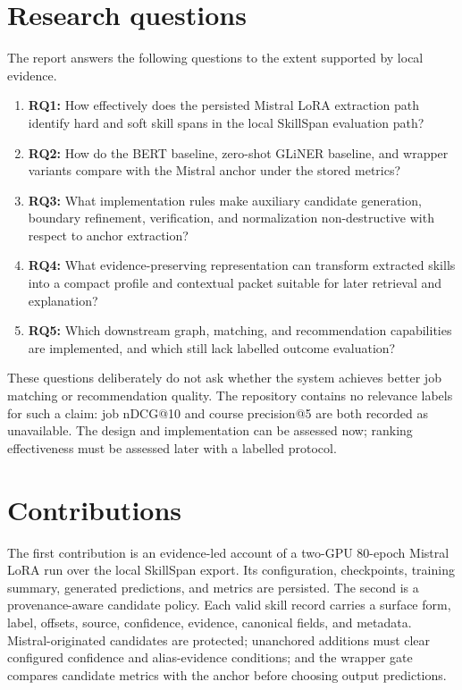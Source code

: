 \section{Research questions}

The report answers the following questions to the extent supported by local evidence.

\begin{enumerate}
  \item \textbf{RQ1:} How effectively does the persisted Mistral LoRA extraction path identify hard and soft skill spans in the local SkillSpan evaluation path?
  \item \textbf{RQ2:} How do the BERT baseline, zero-shot GLiNER baseline, and wrapper variants compare with the Mistral anchor under the stored metrics?
  \item \textbf{RQ3:} What implementation rules make auxiliary candidate generation, boundary refinement, verification, and normalization non-destructive with respect to anchor extraction?
  \item \textbf{RQ4:} What evidence-preserving representation can transform extracted skills into a compact profile and contextual packet suitable for later retrieval and explanation?
  \item \textbf{RQ5:} Which downstream graph, matching, and recommendation capabilities are implemented, and which still lack labelled outcome evaluation?
\end{enumerate}

These questions deliberately do not ask whether the system achieves better job matching or recommendation quality. The repository contains no relevance labels for such a claim: job nDCG@10 and course precision@5 are both recorded as unavailable. The design and implementation can be assessed now; ranking effectiveness must be assessed later with a labelled protocol.

\section{Contributions}

The first contribution is an evidence-led account of a two-GPU 80-epoch Mistral LoRA run over the local SkillSpan export. Its configuration, checkpoints, training summary, generated predictions, and metrics are persisted. The second is a provenance-aware candidate policy. Each valid skill record carries a surface form, label, offsets, source, confidence, evidence, canonical fields, and metadata. Mistral-originated candidates are protected; unanchored additions must clear configured confidence and alias-evidence conditions; and the wrapper gate compares candidate metrics with the anchor before choosing output predictions.

